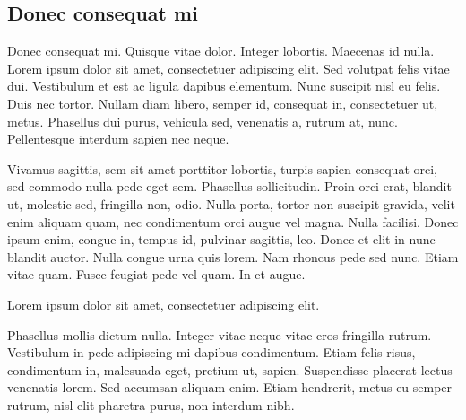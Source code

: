 \documentclass[../hdr.tex]{subfiles}
\begin{document}
\subsection{Donec consequat mi}

Donec consequat mi. Quisque vitae dolor. Integer lobortis. Maecenas id nulla.
Lorem ipsum dolor sit amet, consectetuer adipiscing elit. Sed volutpat felis
vitae dui. Vestibulum et est ac ligula dapibus elementum. Nunc suscipit nisl eu
felis. Duis nec tortor. Nullam diam libero, semper id, consequat in,
consectetuer ut, metus. Phasellus dui purus, vehicula sed, venenatis a, rutrum
at, nunc. Pellentesque interdum sapien nec neque.

Vivamus sagittis, sem sit amet porttitor lobortis, turpis sapien consequat orci,
sed commodo nulla pede eget sem. Phasellus sollicitudin. Proin orci erat,
blandit ut, molestie sed, fringilla non, odio. Nulla porta, tortor non suscipit
gravida, velit enim aliquam quam, nec condimentum orci augue vel magna. Nulla
facilisi. Donec ipsum enim, congue in, tempus id, pulvinar sagittis, leo. Donec
et elit in nunc blandit auctor. Nulla congue urna quis lorem. Nam rhoncus pede
sed nunc. Etiam vitae quam. Fusce feugiat pede vel quam. In et augue.

Lorem ipsum dolor sit amet, consectetuer adipiscing elit.

Phasellus mollis dictum nulla. Integer vitae neque vitae eros fringilla rutrum.
Vestibulum in pede adipiscing mi dapibus condimentum. Etiam felis risus,
condimentum in, malesuada eget, pretium ut, sapien. Suspendisse placerat lectus
venenatis lorem. Sed accumsan aliquam enim. Etiam hendrerit, metus eu semper
rutrum, nisl elit pharetra purus, non interdum nibh.



\ifSubfilesClassLoaded{%
\listoftodos
\clearpage
  \printbibliography
}{%
}
\end{document}
